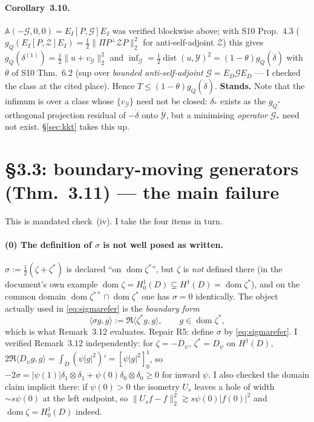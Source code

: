 \documentclass[11pt]{article}
\newcommand{\Aop}{\mathbb A}
\DeclareMathOperator{\dist}{dist}
\begin{document}
\paragraph{Corollary~3.10.}  $\Aop(-\mathcal G,0,0)=E_I[P,\mathcal G]E_I$ was verified
blockwise above; with S10 Prop.~4.3 ($g_Q(E_I[P,\mathcal Z]E_I)=\frac12\|\Pi P^\perp\mathcal ZP\|_2^2$
for anti-self-adjoint $\mathcal Z$) this gives
$g_Q(\delta^{(1)})=\frac12\|u+v_{\mathcal G}\|_2^2$ and
$\inf_{\mathcal G}=\frac12\dist(u,\mathcal Y)^2=(1-\theta)g_Q(\dot\delta)$ with $\theta$
of S10 Thm.~6.2 (sup over \emph{bounded anti-self-adjoint} $\mathcal G=E_D\mathcal GE_D$ ---
I checked the class at the cited place).  Hence $T\le(1-\theta)g_Q(\dot\delta)$.
\textbf{Stands.}  Note that the infimum is over a class whose $\{v_{\mathcal G}\}$ need not
be closed: $\delta_*$ exists as the $g_Q$-orthogonal projection residual of $-\dot\delta$
onto $\overline{\mathcal Y}$, but a minimising \emph{operator} $\mathcal G_*$ need not
exist.  \S\ref{sec:kkt} takes this up.

\section{\S3.3: boundary-moving generators (Thm.~3.11) --- the main failure}\label{sec:bdry}

This is mandated check~(iv).  I take the four items in turn.

\paragraph{(0) The definition of $\sigma$ is not well posed as written.}
$\sigma:=\frac12(\zeta+\zeta^*)$ is declared ``on $\operatorname{dom}\zeta^*$'', but $\zeta$
is \emph{not} defined there (in the document's own example
$\operatorname{dom}\zeta=H^1_0(D)\subsetneq H^1(D)=\operatorname{dom}\zeta^*$), and on the
common domain $\operatorname{dom}\zeta^{**}\cap\operatorname{dom}\zeta^*$ one has
$\sigma=0$ identically.  The object actually used in \eqref{eq:sigmarefer} is the
\emph{boundary form}
\begin{equation}\label{eq:sigmarefer}
 \langle\sigma g,g\rangle:=\Re\langle\zeta^*g,g\rangle ,\qquad g\in\operatorname{dom}\zeta^* ,
\end{equation}
which is what Remark~3.12 evaluates.  Repair R5: define $\sigma$ by \eqref{eq:sigmarefer}.
I verified Remark~3.12 independently: for $\zeta=-D_\psi$, $\zeta^*=D_\psi$ on $H^1(D)$,
$2\Re\langle D_\psi g,g\rangle=\int_D(\psi|g|^2)'=[\psi|g|^2]_0^1$, so
$-2\sigma=|\psi(1)|\delta_1\otimes\delta_1+\psi(0)\delta_0\otimes\delta_0\ge0$ for inward
$\psi$.  I also checked the domain claim implicit there: if $\psi(0)>0$ the isometry
$U_s$ leaves a hole of width $\sim s\psi(0)$ at the left endpoint, so
$\|U_sf-f\|_2^2\gtrsim s\psi(0)|f(0)|^2$ and $\operatorname{dom}\zeta=H^1_0(D)$ indeed.
\end{document}

